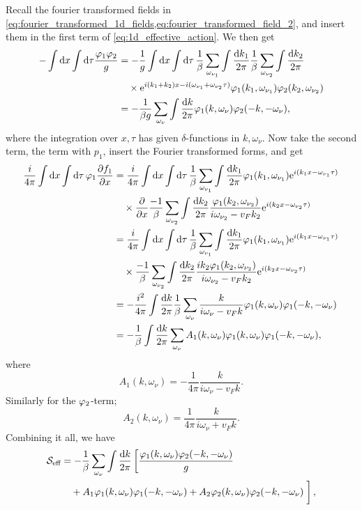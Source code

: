Recall the fourier transformed fields in \cref{eq:fourier_transformed_1d_fields,eq:fourier_transformed_field_2}, and insert them  in the first term of \cref{eq:1d_effective_action}. We then get
\begin{align*}
-\int\dd{x}\int\dd\tau\frac{\varphi_1\varphi_2}{g} &= -\frac{1}{g}\int\dd{x}\int\dd{\tau}\frac{1}{\beta}\sum_{\omega_{\nu_1}}\int\frac{\dd{k_1}}{2\pi}\frac{1}{\beta}\sum_{\omega_{\nu_2}}\int\frac{\dd{k_2}}{2\pi} \\
&\quad\times \mathrm{e}^{i(k_1+k_2)x - i(\omega_{\nu_1}+\omega_{\nu_2}\tau)}\varphi_1(k_1,\omega_{\nu_1})\varphi_2(k_2, \omega_{\nu_2})\\
&= -\frac{1}{\beta g}\sum_{\omega_\nu}\int\frac{\dd{k}}{2\pi}\varphi_1(k,\omega_\nu)\varphi_2(-k,-\omega_\nu),
\end{align*}
where the integration over $x, \tau$ has given $\delta$-functions in $k,\omega_\nu$.
Now take the second term, the term with $p_1$, insert the Fourier transformed forms, and get
\begin{align*}
\frac{i}{4\pi}\int\dd{x}\int\dd{\tau}\varphi_1\pdv{f_1}{x} &= \frac{i}{4\pi}\int\dd{x}\int\dd{\tau}\frac{1}{\beta}\sum_{\omega_{\nu_1}}\int\frac{\dd{k_1}}{2\pi}\varphi_1(k_1, \omega_{\nu_1})\mathrm{e}^{i(k_1x - \omega_{\nu_1}\tau)} \\&\quad\times \pdv{x}\frac{-1}{\beta} \sum_{\omega_{\nu_2}}\int\frac{\dd{k_2}}{2\pi}\frac{\varphi_1(k_2, \omega_{\nu_2})}{i\omega_{\nu_2} - v_Fk_2}\mathrm{e}^{i(k_2x - \omega_{\nu_2}\tau)} \\
&= \frac{i}{4\pi}\int\dd{x}\int\dd{\tau}\frac{1}{\beta}\sum_{\omega_{\nu_1}}\int\frac{\dd{k_1}}{2\pi}\varphi_1(k_1, \omega_{\nu_1})\mathrm{e}^{i(k_1x - \omega_{\nu_1}\tau)} \\&\quad\times \frac{-1}{\beta} \sum_{\omega_{\nu_2}}\int\frac{\dd{k_2}}{2\pi}\frac{ik_2\varphi_1(k_2, \omega_{\nu_2})}{i\omega_{\nu_2} - v_Fk_2}\mathrm{e}^{i(k_2x - \omega_{\nu_2}\tau)} \\
&= -\frac{i^2}{4\pi}\int\frac{\dd{k}}{2\pi}\frac{1}{\beta}\sum_{\omega_\nu}\frac{k}{i\omega_\nu-v_Fk}\varphi_1(k, \omega_\nu)\varphi_1(-k,-\omega_\nu) \\
&= -\frac{1}{\beta}\int\frac{\dd{k}}{2\pi}\sum_{\omega_\nu}A_1(k,\omega_\nu)\varphi_1(k, \omega_\nu)\varphi_1(-k,-\omega_\nu), 
\end{align*}
where \[A_1(k,\omega_\nu) = -\frac{1}{4\pi}\frac{k}{i\omega_\nu - v_Fk}.\]
Similarly for the $\varphi_2$-term;
\[A_2(k,\omega_\nu) = \frac{1}{4\pi}\frac{k}{i\omega_\nu +v_Fk}.\]
Combining it all, we have
\begin{align}
\begin{split}
\mathcal{S}_{\text{eff}} &= -\frac{1}{\beta}\sum_{\omega_\nu}\int\frac{\dd{k}}{2\pi}\left[\frac{\varphi_1(k,\omega_\nu)\varphi_2(-k,-\omega_\nu)}{g}\right. \\
&\quad+ A_1\varphi_1(k,\omega_\nu)\varphi_1(-k,-\omega_\nu)
+ A_2\varphi_2(k,\omega_\nu)\varphi_2(-k,-\omega_\nu)\left.\vphantom{\int}\right],
\end{split}
\end{align}

